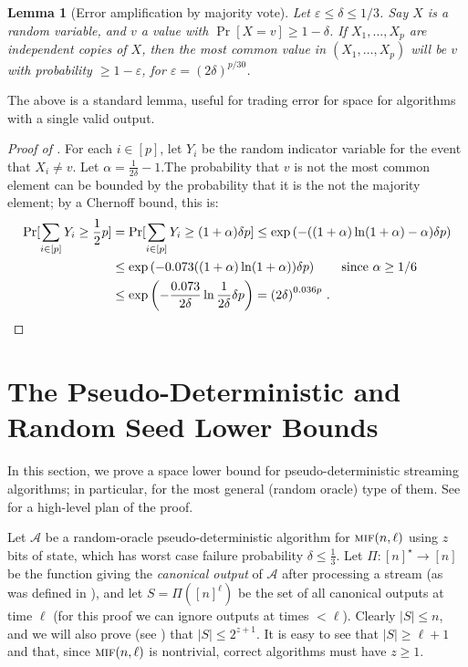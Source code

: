 \documentclass[10pt,a4paper]{article}
\newtheorem{lemma}[theorem]{Lemma}
\theoremstyle{definition}
\theoremstyle{remark}
\newcommand{\cA}{\mathcal{A}}
\let\epsilon\varepsilon
\newcommand{\mif}{\textsc{mif}\xspace}
\newcommand{\rl}{\mathbf{\ell}}             %
\begin{document}
\begin{itemize}
\begin{itemize}
\begin{lemma}[Error amplification by majority vote]\label{lem:error-reduction-by-vote}
  Let $\epsilon \le \delta \le 1/3$. Say $X$ is a random variable, and $v$ a value with $\Pr[X = v] \ge 1 - \delta$. If $X_1,\ldots,X_p$ are independent copies of $X$, then the most common value in $(X_1,\ldots,X_p)$ will be $v$ with probability $\ge 1 - \epsilon$, for $\epsilon = \left(2\delta\right)^{p / 30}$.
\end{lemma}

\noindent The above is a standard lemma, useful for trading error for space
for algorithms with a single valid output.

\begin{proof}[Proof of ]
  For each $i \in [p]$, let $Y_i$ be the random indicator variable for the event that $X_i \ne v$. Let $\alpha = \frac{1}{2 \delta} - 1$.The probability that $v$ is not the most common element can be bounded by the probability that it is the not the majority element; by a Chernoff bound, this is:
  \begin{align*}
    \Pr[\sum_{i\in[p]} Y_i \ge \frac{1}{2} p] &= \Pr[\sum_{i\in[p]} Y_i \ge (1 + \alpha) \delta p] \le \exp\left( - ((1+\alpha) \ln(1+\alpha) - \alpha) \delta p\right) \\
      &\le \exp\left( - 0.073 ((1+\alpha) \ln(1+\alpha) ) \delta p\right) \qquad \text{since $\alpha \ge 1/6$} \\
      &\le \exp\left( - \frac{0.073 }{2\delta} \ln\frac{1}{2\delta} \delta p\right) = \left(2\delta\right)^{0.036 p} \,. \qedhere
  \end{align*}
\end{proof}

\section{The Pseudo-Deterministic and Random Seed Lower Bounds}\label{sec:pd-lb}

In this section, we prove a space lower bound for pseudo-deterministic
streaming algorithms; in particular, for the most general (random oracle) type
of them. See  for a high-level plan of the proof.

Let $\cA$ be a random-oracle pseudo-deterministic algorithm for $\mif(n, \rl)$
using $z$ bits of state, which has worst case failure probability $\delta \le
\frac{1}{3}$. Let $\Pi \colon [n]^\star \to [n]$ be the function giving the
{\em canonical output} of $\cA$ after processing a stream (as was defined in
), and let $S = \Pi([n]^\rl)$ be the set of all canonical
outputs at time $\rl$ (for this proof we can ignore outputs at times $<\rl$).
Clearly $|S| \le n$, and we will also prove (see ) that
$|S| \le 2^{z+1}$. It is easy to see that $|S| \ge \rl + 1$ and that, since
$\mif(n,\rl)$ is nontrivial, correct algorithms must have $z \ge 1$.


\end{itemize}
\end{itemize}
\end{document}
